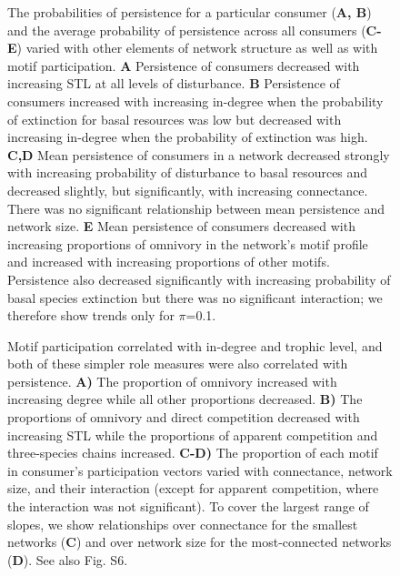 \documentclass[12pt]{article}
\begin{document}
\begin{spacing}{2.0}
    \begin{figure}[ht!]
        \centering
        \caption{The probabilities of persistence for a particular consumer (\textbf{A, B}) and the average probability of persistence across all consumers (\textbf{C-E}) varied with other elements of network structure as well as with motif participation.
        \textbf{A} Persistence of consumers decreased with increasing STL at all levels of disturbance.
        \textbf{B} Persistence of consumers increased with increasing in-degree when the probability of extinction for basal resources was low but decreased with increasing in-degree when the probability of extinction was high.
        \textbf{C,D} Mean persistence of consumers in a network decreased strongly with increasing probability of disturbance to basal resources and decreased slightly, but significantly, with increasing connectance. There was no significant relationship between mean persistence and network size.
        \textbf{E} Mean persistence of consumers decreased with increasing proportions of omnivory in the network's motif profile and increased with increasing proportions of other motifs. Persistence also decreased significantly with increasing probability of basal species extinction but there was no significant interaction; we therefore show trends only for $\pi$=0.1.}
        \label{fig:lm_CS}
    \end{figure}

    \begin{figure}[hb!]
        \centering
        \caption{Motif participation correlated with in-degree and trophic level, and both of these simpler role measures were also correlated with persistence. \textbf{A)} The proportion of omnivory increased with increasing degree while all other proportions decreased. \textbf{B)} The proportions of omnivory and direct competition decreased with increasing STL while the proportions of apparent competition and three-species chains increased. \textbf{C-D)} The proportion of each motif in consumer's participation vectors varied with connectance, network size, and their interaction (except for apparent competition, where the interaction was not significant). To cover the largest range of slopes, we show relationships over connectance for the smallest networks (\textbf{C}) and over network size for the most-connected networks (\textbf{D}). See also Fig. S6.}
        \label{fig:motifs_vs_TL_and_deg}
    \end{figure}        

\end{spacing}
\end{document}
